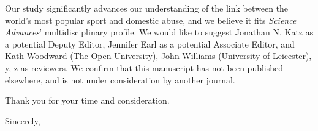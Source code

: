 \documentclass{letter}
\begin{document}
\begin{letter}
Our study significantly advances our understanding of the link between the world's most popular sport and domestic abuse, and we believe it fits \textit{Science Advances}' multidisciplinary profile. We would like to suggest Jonathan N. Katz as a potential Deputy Editor, Jennifer Earl as a potential Associate Editor, and Kath Woodward (The Open University), John Williams (University of Leicester), y, z as reviewers. We confirm that this manuscript has not been published elsewhere, and is not under consideration by another journal.

Thank you for your time and consideration.

\closing{Sincerely,}



\end{letter}
\end{document}
